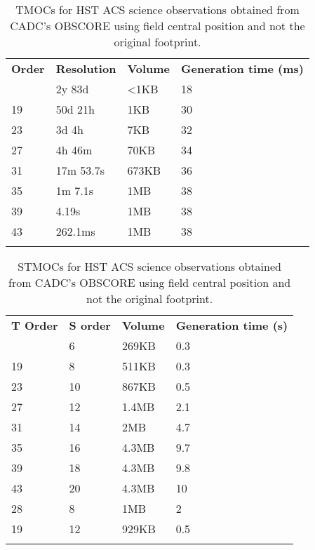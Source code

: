 \begin{table}[!htbp]
\begin{center}
{\scriptsize
\begin{tabular}{p{}p{}p{}p{}}
\sptablerule
\textbf{Order} & \textbf{Resolution} & \textbf{Volume} & \textbf{Generation \newline time (ms)}\\
\sptablerule
15&	2y 83d&	<1KB&	18 \\
19&	50d 21h	&1KB&	30 \\
23&	3d 4h&	7KB&	32 \\
27&	4h 46m&	70KB&	34 \\
31&	17m 53.7s&	673KB&	36 \\
35&	1m 7.1s&	1MB&	38 \\
39&	4.19s&	1MB&	38 \\
43&	262.1ms&	1MB&	38 \\
\sptablerule
\end{tabular}
\caption[TMOC performances]{TMOCs for HST ACS science observations obtained from CADC's OBSCORE using field central position and not the original footprint.}
\normalsize
\label{table:tmocsizeacs}
}
\end{center}
\end{table}


\begin{table}[!htbp]
\begin{center}
{\scriptsize
\begin{tabular}{p{}p{}p{}p{}}
\sptablerule
\textbf{T Order} & \textbf{S order} & \textbf{Volume} & \textbf{Generation \newline time (s)}\\
\sptablerule
15&	6&	269KB&	0.3\\
19&	8&	511KB&	0.3\\
23&	10&	867KB&	0.5\\
27&	12&	1.4MB&	2.1\\
31&	14&	2MB&	4.7\\
35&	16&	4.3MB&	9.7\\
39&	18&	4.3MB&	9.8\\
43&	20&	4.3MB&	10\\
28&	8&	1MB&	2\\
19&	12&	929KB&	0.5\\
\sptablerule
\end{tabular}
\caption[STMOC performances]{STMOCs for HST ACS science observations obtained from CADC's OBSCORE using field central position and not the original footprint.}
\normalsize
\label{table:stmocsizeacs}
}
\end{center}
\end{table}

